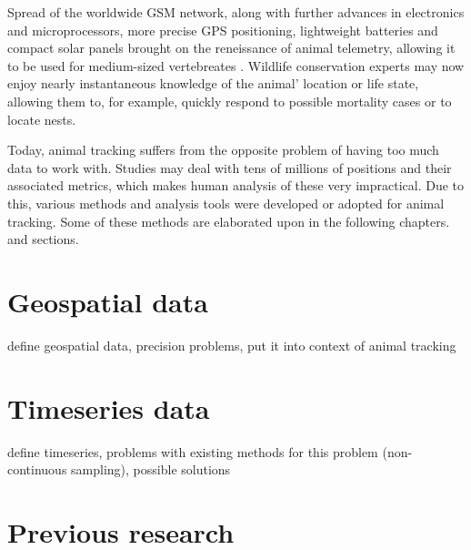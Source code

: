Spread of the worldwide GSM network, along with further advances in electronics and microprocessors, more precise GPS positioning, lightweight batteries and compact solar panels brought on the reneissance of animal telemetry, allowing it to be used for medium-sized vertebreates \cite{kays2015terrestrial}. Wildlife conservation experts may now enjoy nearly instantaneous knowledge of the animal' location or life state, allowing them to, for example, quickly respond to possible mortality cases or to locate nests. 


Today, animal tracking suffers from the opposite problem of having too much data to work with. Studies may deal with tens of millions of positions and their associated metrics, which makes human analysis of these very impractical. Due to this, various methods and analysis tools were developed or adopted for animal tracking. Some of these methods are elaborated upon in the following chapters. and sections.

\section{Geospatial data}

define geospatial data, precision problems, put it into context of animal tracking

\section{Timeseries data}

define timeseries, problems with existing methods for this problem (non-continuous sampling), possible solutions


\section{Previous research}

